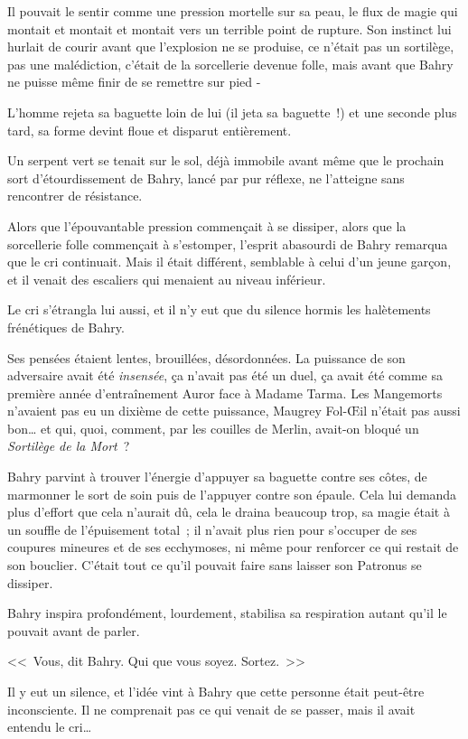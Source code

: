 Il pouvait le sentir comme une pression mortelle sur sa peau, le flux de magie qui montait et montait et montait vers un terrible point de rupture. Son instinct lui hurlait de courir avant que l'explosion ne se produise, ce n'était pas un sortilège, pas une malédiction, c'était de la sorcellerie devenue folle, mais avant que Bahry ne puisse même finir de se remettre sur pied -

L'homme rejeta sa baguette loin de lui (il jeta sa baguette~!) et une seconde plus tard, sa forme devint floue et disparut entièrement.

Un serpent vert se tenait sur le sol, déjà immobile avant même que le prochain sort d'étourdissement de Bahry, lancé par pur réflexe, ne l'atteigne sans rencontrer de résistance.

Alors que l'épouvantable pression commençait à se dissiper, alors que la sorcellerie folle commençait à s'estomper, l'esprit abasourdi de Bahry remarqua que le cri continuait. Mais il était différent, semblable à celui d'un jeune garçon, et il venait des escaliers qui menaient au niveau inférieur.

Le cri s'étrangla lui aussi, et il n'y eut que du silence hormis les halètements frénétiques de Bahry.

Ses pensées étaient lentes, brouillées, désordonnées. La puissance de son adversaire avait été \emph{insensée}, ça n'avait pas été un duel, ça avait été comme sa première année d'entraînement Auror face à Madame Tarma. Les Mangemorts n'avaient pas eu un dixième de cette puissance, Maugrey Fol-Œil n'était pas aussi bon… et qui, quoi, comment, par les couilles de Merlin, avait-on bloqué un \emph{Sortilège de la Mort}~?

Bahry parvint à trouver l'énergie d'appuyer sa baguette contre ses côtes, de marmonner le sort de soin puis de l'appuyer contre son épaule. Cela lui demanda plus d'effort que cela n'aurait dû, cela le draina beaucoup trop, sa magie était à un souffle de l'épuisement total~; il n'avait plus rien pour s'occuper de ses coupures mineures et de ses ecchymoses, ni même pour renforcer ce qui restait de son bouclier. C'était tout ce qu'il pouvait faire sans laisser son Patronus se dissiper.

Bahry inspira profondément, lourdement, stabilisa sa respiration autant qu'il le pouvait avant de parler.

<<~Vous, dit Bahry. Qui que vous soyez. Sortez.~>>

Il y eut un silence, et l'idée vint à Bahry que cette personne était peut-être inconsciente. Il ne comprenait pas ce qui venait de se passer, mais il avait entendu le cri…

